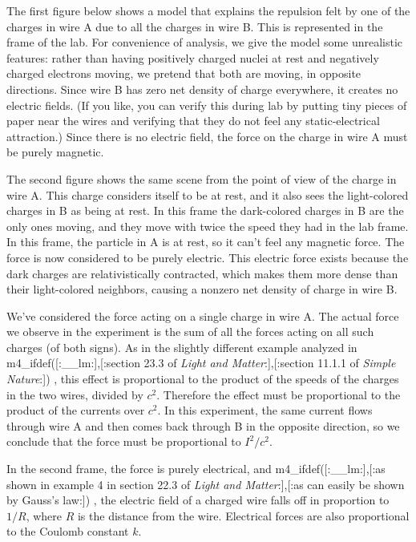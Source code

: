 \analysis

The first figure below shows a model that explains the repulsion felt by
one of the charges in wire A due to all the charges in wire B. This
is represented in the frame of the lab. For convenience of analysis,
we give the model some unrealistic features: rather than having positively
charged nuclei at rest and negatively charged electrons moving, we pretend
that both are moving, in opposite directions. Since wire B has zero net
density of charge everywhere, it creates no electric fields. (If you like,
you can verify this during lab by putting tiny pieces of paper near the
wires and verifying that they do not feel any static-electrical attraction.)
Since there is no electric field, the force on
the charge in wire A must be purely magnetic.


The second figure shows the same scene from the point of view of the
charge in wire A. This charge considers itself to be at rest, and it
also sees the light-colored charges in B as being at rest. In this
frame the dark-colored charges in B are the only ones moving, and they
move with twice the
speed they had in the lab frame. In this frame, the particle in A
is at rest, so it can't feel any magnetic force. The force is now
considered to be purely electric. This electric force exists because
the dark charges are relativistically contracted, which makes them more dense than their
light-colored neighbors, causing a nonzero net density of charge in
wire B. 


We've considered the force acting on a single charge in wire A. The
actual force we observe in the experiment is the sum of all the forces
acting on all such charges (of both signs).
As in the slightly different example analyzed in 
m4_ifdef([:__lm:],[:section 23.3 of \emph{Light and Matter}:],[:section 11.1.1 of \emph{Simple Nature}:])%
, this effect is proportional to the product
of the speeds of the charges in the two wires, divided by $c^2$.
Therefore the effect must
be proportional to the product of the currents over $c^2$. In this experiment, the
same current flows through wire A and then comes back through B in the opposite
direction, so we conclude that the force must be proportional to $I^2/c^2$.

In the second frame, the force is purely electrical, and 
m4_ifdef([:__lm:],[:as shown in example 4 in section 22.3 of \emph{Light and Matter}:],[:as can easily be shown by Gauss's law:])%
, the electric field of a charged
wire falls off in proportion to $1/R$, where $R$ is the distance from the
wire. Electrical forces are also proportional to the Coulomb constant $k$.

